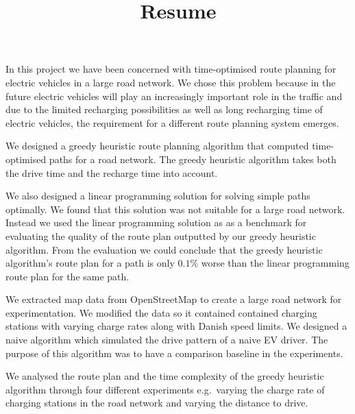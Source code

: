 \documentclass[a4paper, 12pt]{article}
\title{Resume}
\begin{document}
\maketitle
In this project we have been concerned with time-optimised route planning for electric vehicles in a large road network. We chose this problem because in the future electric vehicles will play an increasingly important role in the traffic and due to the limited recharging possibilities as well as long recharging time of electric vehicles, the requirement for a different route planning system emerges.

We designed a greedy heuristic route planning algorithm that computed time-optimised paths for a road network. The greedy heuristic algorithm takes both the drive time and the recharge time into account. 

We also designed a linear programming solution for solving simple paths optimally. We found that this solution was not suitable for a large road network. Instead we used the linear programming solution as as a benchmark for evaluating the quality of the route plan outputted by our greedy heuristic algorithm. From the evaluation we could conclude that the greedy heuristic algorithm's route plan for a path is only $0.1\%$ worse than the linear programming route plan for the same path.

We extracted map data from OpenStreetMap to create a large road network for experimentation. We modified the data so it contained contained charging stations with varying charge rates along with Danish speed limits. We designed a naive algorithm which simulated the drive pattern of a naive EV driver. The purpose of this algorithm was to have a comparison baseline in the experiments.

We analysed the route plan and the time complexity of the greedy heuristic algorithm through four different experiments e.g.\ varying the charge rate of charging stations in the road network and varying the distance to drive. 
\end{document}
